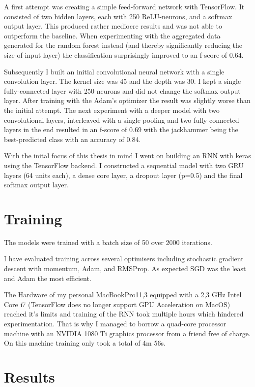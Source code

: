 A first attempt was creating a simple feed-forward network with TensorFlow. It consisted of two hidden layers, each with 250 ReLU-neurons, and a softmax output layer. This produced rather mediocre results and was not able to outperform the baseline. When experimenting with the aggregated data generated for the random forest instead (and thereby significantly reducing the size of input layer) the classification surprisingly improved to an f-score of 0.64.


Subsequently I built an initial convolutional neural network with a single convolution layer.  The kernel size was 45 and the depth was 30. I kept a single fully-connected layer with 250 neurons and did not change the softmax output layer. After training with the Adam's optimizer the result was slightly worse than the initial attempt. The next experiment with a deeper model with two convolutional layers, interleaved with a single pooling and two fully connected layers in the end resulted in an f-score of 0.69 with the jackhammer being the best-predicted class with an accuracy of 0.84. 

With the inital focus of this thesis in mind I went on building an RNN with keras using the TensorFlow backend. I constructed a sequential model with two GRU layers (64 units each), a dense core layer, a dropout layer (p=0.5) and the final softmax output layer.

\section{Training}

The models were trained with a batch size of 50 over 2000 iterations.

I have evaluated training across several optimisers including stochastic gradient descent with momentum, Adam, and RMSProp. As expected SGD was the least and Adam the most efficient.

The Hardware of my personal MacBookPro11,3 equipped with a 2,3 GHz Intel Core i7 (TensorFlow does no longer support GPU Acceleration on MacOS) reached it's limits and training of the RNN took multiple hours which hindered experimentation. That is why I managed to borrow a quad-core processor machine with an NVIDIA 1080 Ti graphics processor from a friend free of charge. On this machine training only took a total of 4m 56s.


\section{Results}
\label{results}

